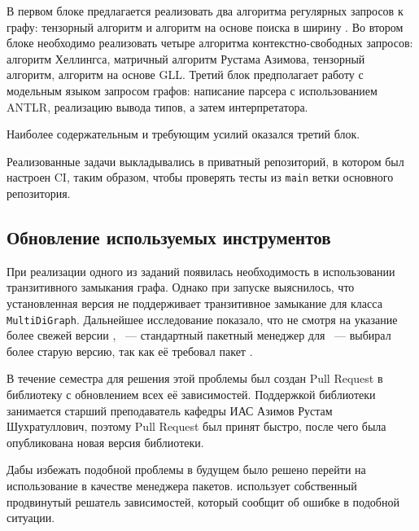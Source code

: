 В первом блоке предлагается реализовать два алгоритма регулярных запросов к графу: тензорный алгоритм и алгоритм на основе поиска в ширину .
Во втором блоке необходимо реализовать четыре алгоритма контекстно-свободных запросов: алгоритм Хеллингса, матричный алгоритм Рустама Азимова, тензорный алгоритм, алгоритм на основе GLL.
Третий блок предполагает работу с модельным языком запросом графов: написание парсера с использованием \textsc{ANTLR}, реализацию вывода типов, а затем интерпретатора.

Наиболее содержательным и требующим усилий оказался третий блок.

Реализованные задачи выкладывались в приватный репозиторий, в котором был настроен CI, таким образом, чтобы проверять тесты из \texttt{main} ветки основного репозитория.

\subsection{Обновление используемых инструментов}
\label{subsec:housekeeping}

При реализации одного из заданий появилась необходимость в использовании транзитивного замыкания графа.
Однако при запуске выяснилось, что установленная версия \networkx{} не поддерживает транзитивное замыкание для класса \texttt{MultiDiGraph}.
Дальнейшее исследование показало, что не смотря на указание более свежей версии \networkx{}, \pip{}~--- стандартный пакетный менеджер для \python{}~--- выбирал более старую версию, так как её требовал пакет \cfpqdata{}.

В течение семестра для решения этой проблемы был создан Pull Request в библиотеку \cfpqdata{} с обновлением всех её зависимостей.
Поддержкой библиотеки занимается старший преподаватель кафедры ИАС Азимов Рустам Шухратуллович, поэтому Pull Request был принят быстро, после чего была опубликована новая версия библиотеки.

Дабы избежать подобной проблемы в будущем было решено перейти на использование \poetry{} в качестве менеджера пакетов.
\poetry{} использует собственный продвинутый решатель зависимостей, который сообщит об ошибке в подобной ситуации.

